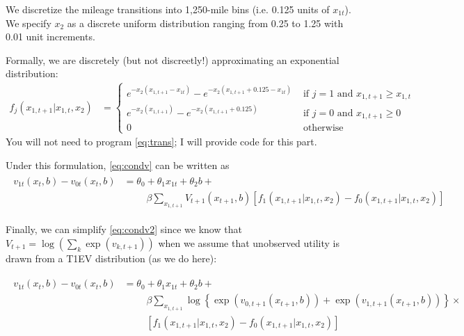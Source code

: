 \documentclass[12pt,english]{article}
\begin{document}
We discretize the mileage transitions into 1,250-mile bins (i.e. 0.125 units of $x_{1t}$). We specify $x_2$ as a discrete uniform distribution ranging from 0.25 to 1.25 with 0.01 unit increments.

Formally, we are discretely (but not discreetly!) approximating an exponential distribution: 
\begin{align}\label{eq:trans}
f_{j}\left(x_{1,t+1}\vert x_{1,t},x_{2}\right) &= \begin{cases}
e^{-x_2(x_{1,t+1}-x_{1t})}-e^{-x_2(x_{1,t+1}+0.125-x_{1t})} & \textrm{  if  } j=1 \textrm{  and  } x_{1,t+1}\geq x_{1,t} \\
e^{-x_2(x_{1,t+1})}-e^{-x_2(x_{1,t+1}+0.125)} & \textrm{  if  } j=0 \textrm{  and  } x_{1,t+1}\geq 0 \\
0 & \textrm{ otherwise} \end{cases}
\end{align}
You will not need to program \eqref{eq:trans}; I will provide code for this part.

Under this formulation, \eqref{eq:condv} can be written as
\begin{align}\label{eq:condv2}
\begin{split}
    v_{1t}\left(x_{t},b\right)-v_{0t}\left(x_{t},b\right) &= \theta_0 + \theta_1 x_{1t} + \theta_2 b + \\
    &\phantom{\text{===}}\beta \sum_{x_{1,t+1}} V_{t+1}\left(x_{t+1},b\right)\left[f_{1}\left(x_{1,t+1}\vert x_{1,t},x_{2}\right) - f_{0}\left(x_{1,t+1}\vert x_{1,t},x_{2}\right)\right]
    \end{split}
\end{align}

Finally, we can simplify \eqref{eq:condv2} since we know that $V_{t+1} = \log\left(\sum_{k} \exp\left(v_{k,t+1}\right)\right)$ when we assume that unobserved utility is drawn from a T1EV distribution (as we do here):

\begin{align}\label{eq:condv3}
\begin{split}
    v_{1t}\left(x_{t},b\right)-v_{0t}\left(x_{t},b\right) &= \theta_0 + \theta_1 x_{1t} + \theta_2 b + \\
    &\phantom{\text{===}}\beta \sum_{x_{1,t+1}} \log\left\{\exp\left(v_{0,t+1}\left(x_{t+1},b\right)\right)+\exp\left(v_{1,t+1}\left(x_{t+1},b\right)\right)\right\}\times\\
    &\phantom{\text{===}}\left[f_{1}\left(x_{1,t+1}\vert x_{1,t},x_{2}\right) - f_{0}\left(x_{1,t+1}\vert x_{1,t},x_{2}\right)\right]
    \end{split}
\end{align}
\end{document}
